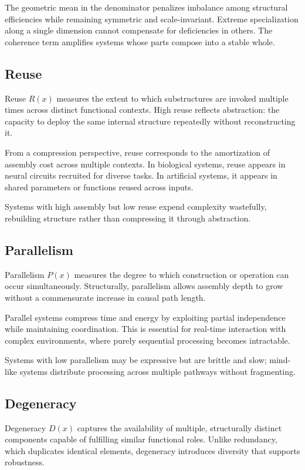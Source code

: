 \documentclass[11pt,letterpaper]{article}
\begin{document}
The geometric mean in the denominator penalizes imbalance among structural efficiencies while remaining symmetric and scale-invariant. Extreme specialization along a single dimension cannot compensate for deficiencies in others. The coherence term amplifies systems whose parts compose into a stable whole.

\subsection{Reuse}

Reuse $R(x)$ measures the extent to which substructures are invoked multiple times across distinct functional contexts. High reuse reflects abstraction: the capacity to deploy the same internal structure repeatedly without reconstructing it.

From a compression perspective, reuse corresponds to the amortization of assembly cost across multiple contexts. In biological systems, reuse appears in neural circuits recruited for diverse tasks. In artificial systems, it appears in shared parameters or functions reused across inputs.

Systems with high assembly but low reuse expend complexity wastefully, rebuilding structure rather than compressing it through abstraction.

\subsection{Parallelism}

Parallelism $P(x)$ measures the degree to which construction or operation can occur simultaneously. Structurally, parallelism allows assembly depth to grow without a commensurate increase in causal path length.

Parallel systems compress time and energy by exploiting partial independence while maintaining coordination. This is essential for real-time interaction with complex environments, where purely sequential processing becomes intractable.

Systems with low parallelism may be expressive but are brittle and slow; mind-like systems distribute processing across multiple pathways without fragmenting.

\subsection{Degeneracy}

Degeneracy $D(x)$ captures the availability of multiple, structurally distinct components capable of fulfilling similar functional roles. Unlike redundancy, which duplicates identical elements, degeneracy introduces diversity that supports robustness.
\end{document}

